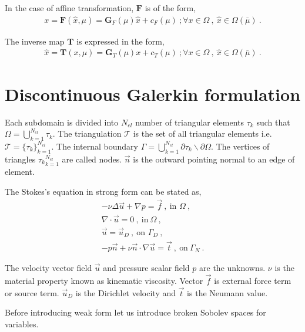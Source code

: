 \documentclass[graybox]{svmult}
\begin{document}
In the case of affine transformation, $\bm{F}$ is of the form,
\begin{gather}\label{affine_F}
x = \bm{F}(\hat{x},\mu) = \bm{G}_F(\mu)\hat{x} + c_F(\mu) \ ; \forall x \in \Omega \ , \ \hat{x} \in \Omega(\bar{\mu}) \ .
\end{gather}

The inverse map $\bm{T}$ is expressed in the form,
\begin{gather}\label{affine_T}
\hat{x} = \bm{T}(x,\mu) = \bm{G}_T(\mu)x + c_T(\mu) \ ; \forall x \in \Omega \ , \ \hat{x} \in \Omega(\bar{\mu}) \ .
\end{gather}

\section{Discontinuous Galerkin formulation}
\label{DG_formulation}

Each subdomain is divided into $N_{el}$ number of triangular elements $\tau_k$ such that $\Omega = \bigcup\limits_{k=1}^{N_{el}} \tau_k$. The triangulation $\mathcal{T}$ is the set of all triangular elements i.e. $\mathcal{T} = \lbrace \tau_k \rbrace_{k=1}^{N_{el}}$. The internal boundary $\Gamma = \bigcup\limits_{k=1}^{N_{el}} \partial \tau_k \backslash \partial \Omega$. The vertices of triangles ${\tau_k}_{k=1}^{N_{el}}$ are called nodes. $\overrightarrow{n}$ is the outward pointing normal to an edge of element.

The Stokes's equation in strong form can be stated as,
\begin{gather}\label{stokes_strong_form}
-\nu \Delta \overrightarrow{u} + \nabla p = \overrightarrow{f} \ , \ \text{in } \Omega \ , \\
\nabla \cdot \overrightarrow{u} = 0 \ , \ \text{in} \ \Omega \ , \\
\overrightarrow{u} = \overrightarrow{u}_D \ , \ \text{on } \Gamma_D \ , \\
-p \overrightarrow{n} + \nu \overrightarrow{n} \cdot \nabla \overrightarrow{u} = \overrightarrow{t} \ , \ \text{on} \ \Gamma_N \ .
\end{gather}

The velocity vector field $\overrightarrow{u}$ and pressure scalar field $p$ are the unknowns. $\nu$ is the material property known as kinematic viscosity. Vector $\overrightarrow{f}$ is external force term or source term. $\overrightarrow{u}_D$ is the Dirichlet velocity and $\overrightarrow{t}$ is the Neumann value.

Before introducing weak form let us introduce broken Sobolev spaces for variables.
\end{document}
